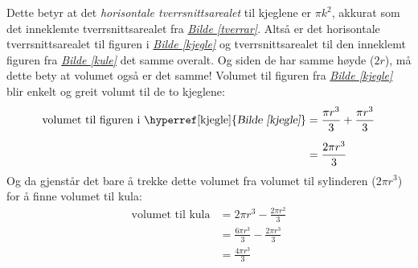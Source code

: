 \documentclass[12pt,english]{report}
\newcommand\fref[2][]{\hyperref[#2]{\textsl{Bilde \ref*{#2}#1}}}
\begin{document}
Dette betyr at det \textit{horisontale tverrsnittsarealet} til kjeglene er $ \pi k^2 $, akkurat som det inneklemte tverrsnittsarealet fra \fref{tverrar}. Altså er det horisontale tverrsnittsarealet til figuren i \fref{kjegle} og tverrsnittsarealet til den inneklemt figuren fra \fref{kule} det samme overalt. Og siden de har samme høyde ($ 2r $), må dette bety at volumet også er det samme! Volumet til figuren fra \fref{kjegle} blir enkelt og greit volumt til de to kjeglene:
\begin{align*}
	\text{volumet til figuren i \fref{kjegle}}&= \frac{\pi r^3}{3}+\frac{\pi r^3}{3} \\[5 pt]
	&= \frac{2\pi r^3}{3}
\end{align*}
Og da gjenstår det bare å trekke dette volumet fra volumet til sylinderen ($ 2\pi r^3 $) for å finne volumet til kula:
\begin{align*}
\text{volumet til kula}&=2\pi r^3- \frac{2\pi r^2}{3} \\
&= \frac{6\pi r^3}{3}-\frac{2\pi r^3}{3} \\
&= \frac{4\pi r^3}{3}
\end{align*}
\end{document}
